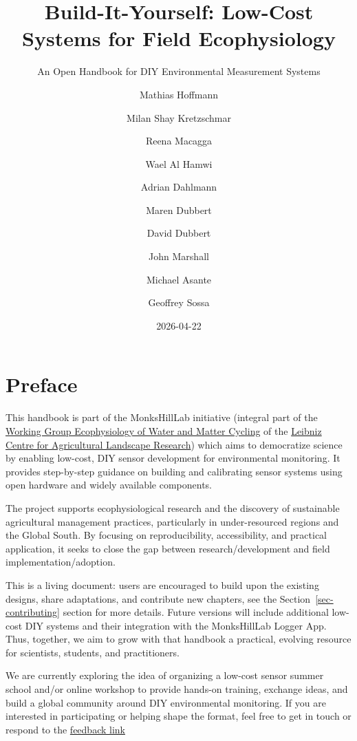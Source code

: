 \documentclass[
  11pt,
  letterpaper,
]{book}
\title{Build-It-Yourself: Low-Cost Systems for Field Ecophysiology}
\subtitle{An Open Handbook for DIY Environmental Measurement Systems}
\author{Mathias Hoffmann \and Milan Shay Kretzschmar \and Reena
Macagga \and Wael Al Hamwi \and Adrian Dahlmann \and Maren
Dubbert \and David Dubbert \and John Marshall \and Michael
Asante \and Geoffrey Sossa}
\date{2026-04-22}
\renewcommand*\contentsname{Table of contents}
\newcommand\contentsname{Table of contents}
\begin{document}
\frontmatter
\maketitle

\renewcommand*\contentsname{Table of contents}
{
\setcounter{tocdepth}{2}
\tableofcontents
}

\mainmatter
{}

\chapter{Preface}\label{sec-preface}

This handbook is part of the MonksHillLab initiative (integral part of
the
\href{https://www.zalf.de/en/struktur/pb1/ibg/Pages/default.aspx}{Working
Group Ecophysiology of Water and Matter Cycling} of the
\href{https://www.zalf.de/en/Pages/ZALF.aspx}{Leibniz Centre for
Agricultural Landscape Research}) which aims to democratize science by
enabling low-cost, DIY sensor development for environmental monitoring.
It provides step-by-step guidance on building and calibrating sensor
systems using open hardware and widely available components.

The project supports ecophysiological research and the discovery of
sustainable agricultural management practices, particularly in
under-resourced regions and the Global South. By focusing on
reproducibility, accessibility, and practical application, it seeks to
close the gap between research/development and field
implementation/adoption.

This is a living document: users are encouraged to build upon the
existing designs, share adaptations, and contribute new chapters, see
the Section~\ref{sec-contributing} section for more details. Future
versions will include additional low-cost DIY systems and their
integration with the MonksHillLab Logger App. Thus, together, we aim to
grow with that handbook a practical, evolving resource for scientists,
students, and practitioners.

We are currently exploring the idea of organizing a low-cost sensor
summer school and/or online workshop to provide hands-on training,
exchange ideas, and build a global community around DIY environmental
monitoring. If you are interested in participating or helping shape the
format, feel free to get in touch or respond to the
\href{https://docs.google.com/forms/d/e/1FAIpQLSd-lZMnjAK-ll1-eMoKwWdKpjrdHeFioPDRd5Fp-lMQW38EWg/viewform?usp=header}{feedback
link}
\end{document}
